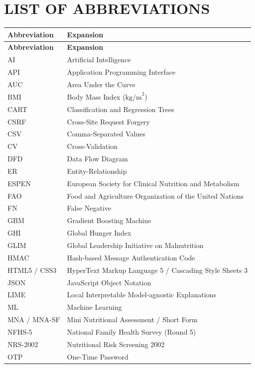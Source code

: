 \documentclass[12pt,a4paper]{report}
\begin{document}
\chapter*{LIST OF ABBREVIATIONS}
\begin{longtable}{@{}p{}p{}@{}}
\toprule
\textbf{Abbreviation} & \textbf{Expansion} \\ \midrule
\endfirsthead
\toprule
\textbf{Abbreviation} & \textbf{Expansion} \\ \midrule
\endhead
AI & Artificial Intelligence \\
API & Application Programming Interface \\
AUC & Area Under the Curve \\
BMI & Body Mass Index ($\text{kg/m}^2$) \\
CART & Classification and Regression Trees \\
CSRF & Cross-Site Request Forgery \\
CSV & Comma-Separated Values \\
CV & Cross-Validation \\
DFD & Data Flow Diagram \\
ER & Entity-Relationship \\
ESPEN & European Society for Clinical Nutrition and Metabolism \\
FAO & Food and Agriculture Organization of the United Nations \\
FN & False Negative \\
GBM & Gradient Boosting Machine \\
GHI & Global Hunger Index \\
GLIM & Global Leadership Initiative on Malnutrition \\
HMAC & Hash-based Message Authentication Code \\
HTML5 / CSS3 & HyperText Markup Language 5 / Cascading Style Sheets 3 \\
JSON & JavaScript Object Notation \\
LIME & Local Interpretable Model-agnostic Explanations \\
ML & Machine Learning \\
MNA / MNA-SF & Mini Nutritional Assessment / Short Form \\
NFHS-5 & National Family Health Survey (Round 5) \\
NRS-2002 & Nutritional Risk Screening 2002 \\
OTP & One-Time Password \\

\end{longtable}
\end{document}
